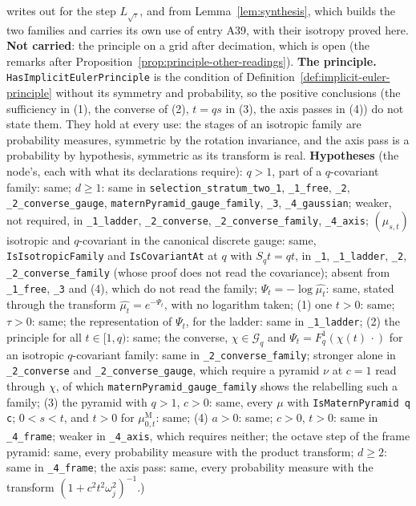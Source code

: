 \begin{theorem}
{writes out for the step $L_{\sqrt\tau}$, and from Lemma~\ref{lem:synthesis}, which builds the two
families and carries its own use of entry A39, with their isotropy proved here.
\textbf{Not carried}: the principle on a grid after decimation, which
is open (the remarks after Proposition~\ref{prop:principle-other-readings}).
\textbf{The principle.} \texttt{HasImplicitEulerPrinciple} is the condition of
Definition~\ref{def:implicit-euler-principle} without its symmetry and probability, so the positive
conclusions (the sufficiency in (1), the converse of (2), $t = qs$ in (3), the axis passes in (4))
do not state them. They hold at every use: the stages of an isotropic family are probability
measures, symmetric by the rotation invariance, and the axis pass is a probability by hypothesis,
symmetric as its transform is real.
\textbf{Hypotheses} (the node's, each with what its declarations require): $q > 1$, part of a
$q$-covariant family: same; $d \ge 1$: same in \texttt{selection\_stratum\_two\_1}, \texttt{\_1\_free},
\texttt{\_2}, \texttt{\_2\_converse\_gauge}, \texttt{maternPyramid\_gauge\_family}, \texttt{\_3},
\texttt{\_4\_gaussian}; weaker, not required, in \texttt{\_1\_ladder}, \texttt{\_2\_converse},
\texttt{\_2\_converse\_family}, \texttt{\_4\_axis}; $(\mu_{s,t})$ isotropic and $q$-covariant in the
canonical discrete gauge: same, \texttt{IsIsotropicFamily} and \texttt{IsCovariantAt} at $q$ with
$S_q t = qt$, in \texttt{\_1}, \texttt{\_1\_ladder}, \texttt{\_2}, \texttt{\_2\_converse\_family}
(whose proof does not read the covariance); absent from \texttt{\_1\_free}, \texttt{\_3} and (4),
which do not read the family; $\Psi_t = -\log\widehat{\mu_t}$: same, stated through the transform
$\widehat{\mu_t} = e^{-\Psi_t}$, with no logarithm taken; (1) one $t > 0$: same; $\tau > 0$: same;
the representation of $\Psi_t$, for the ladder: same in \texttt{\_1\_ladder}; (2) the principle for
all $t \in [1, q)$: same; the converse, $\chi \in \mathcal{G}_q$ and $\Psi_t = F^1_q(\chi(t)\,\cdot)$
for an isotropic $q$-covariant family: same in \texttt{\_2\_converse\_family}; stronger alone in
\texttt{\_2\_converse} and \texttt{\_2\_converse\_gauge}, which require a \Matern{} pyramid $\nu$ at
$c = 1$ read through $\chi$, of which
\texttt{maternPyramid\_gauge\_family} shows the relabelling such a family; (3) the \Matern{} pyramid
with $q > 1$, $c > 0$: same, every $\mu$ with \texttt{IsMaternPyramid q c}; $0 < s < t$, and $t > 0$
for $\mu^{\mathrm M}_{0,t}$: same; (4) $a > 0$: same; $c > 0$, $t > 0$: same in \texttt{\_4\_frame};
weaker in \texttt{\_4\_axis}, which requires neither; the octave step of the frame \Matern{} pyramid:
same, every probability measure with the product transform; $d \ge 2$: same in
\texttt{\_4\_frame}; the axis pass: same, every probability measure with the transform
$(1 + c^2t^2\omega_j^2)^{-1}$.)}
\end{theorem}

